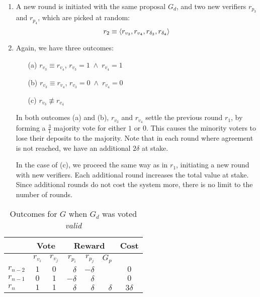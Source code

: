 \begin{enumerate}
    \item A new round is initiated with the same proposal $G_d$, and two new
        verifiers $r_{p_3}$ and $r_{p_4}$, which are picked at random:
        \begin{equation*}
            r_2 \equiv \langle r_{v_3}, r_{v_4}, r_{\delta_3}, r_{\delta_4} \rangle
        \end{equation*}
    \item Again, we have three outcomes:
        \smallskip
        \begin{enumerate}
            \item[(a)] $r_{v_3} \equiv r_{v_4}$, \qquad $r_{v_3} = 1 \; \wedge \; r_{v_4} = 1$
            \item[(b)] $r_{v_3} \equiv r_{v_4}$, \qquad $r_{v_3} = 0 \; \wedge \; r_{v_4} = 0$
            \item[(c)] $r_{v_3} \not\equiv r_{v_4}$
        \end{enumerate}
        \smallskip
        In both outcomes (a) and (b), $r_{v_3}$ and $r_{v_4}$ settle the
        previous round $r_1$, by forming a $\frac{3}{1}$ majority vote for
        either $1$ or $0$. This causes the minority voters to lose their
        deposits to the majority. Note that in each round where agreement is
        not reached, we have an additional $2\delta$ at stake.

        In the case of (c), we proceed the same way as in $r_1$, initiating a
        new round with new verifiers.  Each additional round increases the
        total value at stake. Since additional rounds do not cost the system
        more, there is no limit to the number of rounds.
\end{enumerate}

\begin{table}[hbt]
    \caption{Outcomes for $G$ when $G_d$ was voted \emph{valid}}
    \begin{tabular}{lccrrrc}
    \toprule
                  & \multicolumn{2}{c}{Vote} & \multicolumn{3}{c}{Reward} & Cost                    \\
    \midrule
                  & $r_{v_i}$  & $r_{v_j}$   & $r_{p_i}$ & $r_{p_j}$ & $G_p$    &                   \\
    \addlinespace[0.5em]
        $r_{n-2}$ & $1$        & $0$         & $\delta$  & $-\delta$ &          & $0$               \\
        $r_{n-1}$ & $0$        & $1$         & $-\delta$ & $\delta$  &          & $0$               \\
        $r_{n}$   & $1$        & $1$         & $\delta$  & $\delta$  & $\delta$ & $3\delta$         \\
    \bottomrule
    \end{tabular}
\end{table}

